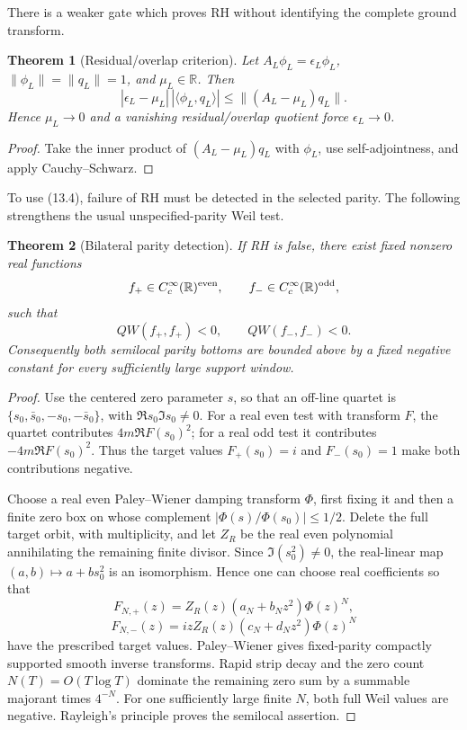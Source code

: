 \documentclass[11pt]{amsart}
\newtheorem{theorem}{Theorem}[section]
\theoremstyle{definition}
\theoremstyle{remark}
\newcommand{\R}{\mathbb R}
\begin{document}
There is a weaker gate which proves RH without identifying the complete
ground transform.

\begin{theorem}[Residual/overlap criterion]
\label{thm:residual-overlap}
Let \(A_L\phi_L=\epsilon_L\phi_L\), \(\|\phi_L\|=\|q_L\|=1\), and
\(\mu_L\in\R\).  Then
\[
 \boxed{
 |\epsilon_L-\mu_L|\,|\langle\phi_L,q_L\rangle|
 \le\|(A_L-\mu_L)q_L\|.}
 \tag{13.4}
\]
Hence \(\mu_L\to0\) and a vanishing residual/overlap quotient force
\(\epsilon_L\to0\).
\end{theorem}

\begin{proof}
Take the inner product of \((A_L-\mu_L)q_L\) with \(\phi_L\), use
self-adjointness, and apply Cauchy--Schwarz.
\end{proof}

To use (13.4), failure of RH must be detected in the selected parity.  The
following strengthens the usual unspecified-parity Weil test.

\begin{theorem}[Bilateral parity detection]
\label{thm:bilateral}
If RH is false, there exist fixed nonzero real functions
\[
 f_+\in C_c^\infty(\R)^{\rm even},
 \qquad f_-\in C_c^\infty(\R)^{\rm odd},
\]
such that
\[
 QW(f_+,f_+)<0,
 \qquad QW(f_-,f_-)<0.
 \tag{13.5}
\]
Consequently both semilocal parity bottoms are bounded above by a fixed
negative constant for every sufficiently large support window.
\end{theorem}

\begin{proof}
Use the centered zero parameter \(s\), so that an off-line quartet is
\(\{s_0,\bar s_0,-s_0,-\bar s_0\}\), with
\(\Re s_0\Im s_0\ne0\).  For a real even test with transform \(F\), the
quartet contributes \(4m\Re F(s_0)^2\); for a real odd test it contributes
\(-4m\Re F(s_0)^2\).  Thus the target values \(F_+(s_0)=i\) and
\(F_-(s_0)=1\) make both contributions negative.

Choose a real even Paley--Wiener damping transform \(\Phi\), first fixing
it and then a finite zero box on whose complement
\(|\Phi(s)/\Phi(s_0)|\le1/2\).  Delete the full target orbit, with
multiplicity, and let \(Z_R\) be the real even polynomial annihilating the
remaining finite divisor.  Since \(\Im(s_0^2)\ne0\), the real-linear map
\((a,b)\mapsto a+bs_0^2\) is an isomorphism.  Hence one can choose real
coefficients so that
\[
 F_{N,+}(z)=Z_R(z)(a_N+b_Nz^2)\Phi(z)^N,
\]
\[
 F_{N,-}(z)=izZ_R(z)(c_N+d_Nz^2)\Phi(z)^N
\]
have the prescribed target values.  Paley--Wiener gives fixed-parity
compactly supported smooth inverse transforms.  Rapid strip decay and
the zero count \(N(T)=O(T\log T)\) dominate the remaining zero sum by a
summable majorant times \(4^{-N}\).  For one sufficiently large finite
\(N\), both full Weil values are negative.  Rayleigh's principle proves
the semilocal assertion.
\end{proof}
\end{document}
